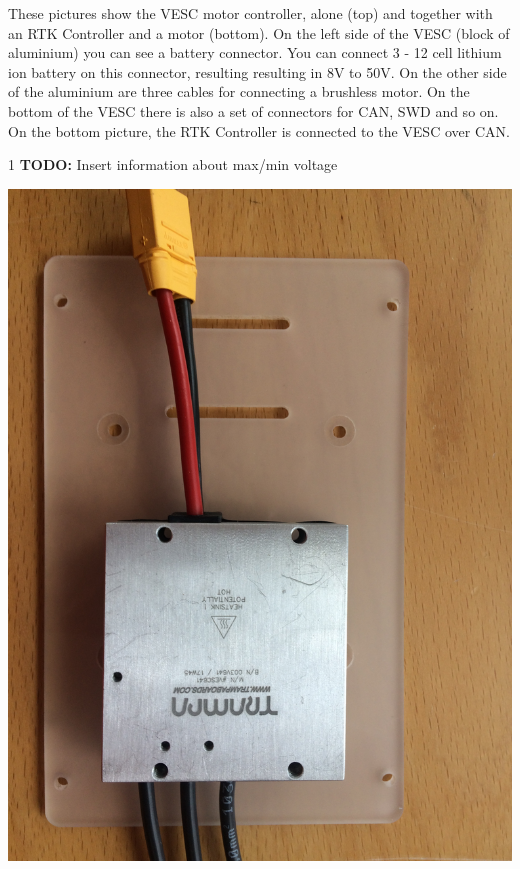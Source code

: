 \documentclass[12pt]{article} %
\def\printtodos{0}
\newcommand{\todo}[1]{
  \if\printtodos1
      {\color{red} \textbf{TODO:} #1}
  \fi}
\begin{document}
\vspace{5mm}

\noindent \begin{minipage}{0.66\textwidth} These pictures show the
  VESC motor controller, alone (top) and together with an RTK
  Controller and a motor (bottom). On the left side of the VESC (block
  of aluminium) you can see a battery connector. You can connect 3 -
  12 cell lithium ion battery on this connector, resulting resulting
  in 8V to 50V. On the other side of the aluminium are three cables
  for connecting a brushless motor.  On the bottom of the VESC there
  is also a set of connectors for CAN, SWD and so on. On the bottom
  picture, the RTK Controller is connected to the VESC over CAN.
  \todo{Insert information about max/min voltage}
\end{minipage}
\begin{minipage}{0.33\textwidth} %
  \noindent \includegraphics[width=\textwidth]{./photos/VESC.JPG}

\end{minipage}
\end{document}
